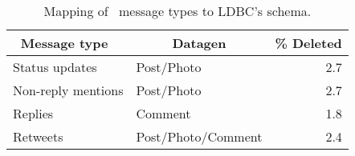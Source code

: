 \begin{table}[H]
  \centering
  \begin{tabular}{ |l|l|r| }
    \hline
    \multicolumn{1}{|c|}{\textbf{Message type~\cite{DBLP:conf/cscw/AlmuhimediWLSA13}}} &
    \multicolumn{1}{c|}{\textbf{Datagen}} &
    \multicolumn{1}{c|}{\textbf{\% Deleted}} \\
    \hline\hline
    Status updates & Post/Photo & 2.7 \\
    \hline
    Non-reply mentions &  Post/Photo & 2.7 \\
    \hline
    Replies & Comment & 1.8 \\
    \hline
    Retweets & Post/Photo/Comment & 2.4 \\
    \hline
  \end{tabular}
  \centering
  \caption{Mapping of~\cite{DBLP:conf/cscw/AlmuhimediWLSA13} message types to LDBC's schema.}
  \label{table:almuhimedi-mapping}
\end{table}
